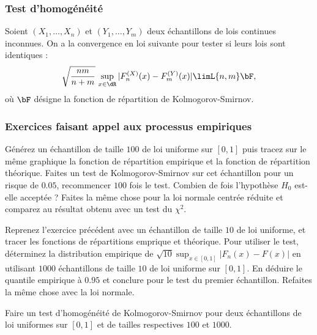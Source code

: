
\subsubsection{Test d'homogénéité}

Soient $(X_1,\ldots,X_n)$ et $(Y_1,\ldots,Y_m)$ deux échantillons de lois continues
inconnues. On a la convergence en loi suivante pour tester si leurs lois sont
identiques :
$$
\sqrt{\frac{nm}{n+m}}
\,
\sup_{x \in \dR}|F_n^{(X)}(x)-F_m^{(Y)}(x)|
\limL{n,m} 
\bF,
$$
où $\bF$ désigne la fonction de répartition de Kolmogorov-Smirnov.

\subsubsection{Exercices faisant appel aux processus empiriques}

\begin{exo}
  Générez un échantillon de taille $100$ de loi uniforme sur $[0,1]$ puis
  tracez sur le même graphique la fonction de répartition empirique et la
  fonction de répartition théorique. Faites un test de Kolmogorov-Smirnov sur
  cet échantillon pour un risque de $0.05$, recommencer $100$ fois le test.
  Combien de fois l'hypothèse $H_0$ est-elle acceptée ? Faites la même chose
  pour la loi normale centrée réduite et comparez au résultat obtenu avec
  un test du $\chi^2$.
\end{exo}

\begin{exo}
  Reprenez l'exercice précédent avec un échantillon de taille $10$ de loi
  uniforme, et tracer les fonctions de répartitions emprique et théorique.
  Pour utiliser le test, déterminez la distribution empirique de
  $\sqrt{10}\sup _{x \in [0,1]} |F_n(x)-F(x)|$ en utilisant $1000$
  échantillons de taille $10$ de loi uniforme sur $[0,1]$. En déduire le
  quantile empirique à $0.95$ et conclure pour le test du premier échantillon.
  Refaites la même chose avec la loi normale.
\end{exo}

\begin{exo}
  Faire un test d'homogénéité de Kolmogorov-Smirnov pour deux échantillons de
  loi uniformes sur $[0,1]$ et de tailles respectives $100$ et $1000$.
\end{exo}

